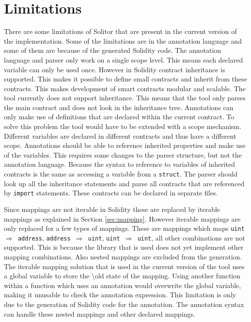 \documentclass[a4paper]{article}
\begin{document}
\section{Limitations}
\label{sec:limitations}
There are some limitations of Solitor that are present in the current version of the implementation. Some of the limitations are in the annotation language and some of them are because of the generated Solidity code. The annotation language and parser only work on a single scope level. This means each declared variable can only be used once. However in Solidity contract inheritance is supported. This makes it possible to define small contracts and inherit from these contracts. This makes development of smart contracts modular and scalable. The tool currently does not support inheritance. This means that the tool only parses the main contract and does not look in the inheritance tree. Annotations can only make use of definitions that are declared within the current contract. To solve this problem the tool would have to be extended with a scope mechanism. Different variables are declared in different contracts and thus have a different scope. Annotations should be able to reference inherited properties and make use of the variables. This requires some changes to the parser structure, but not the annotation language. Because the syntax to reference to variables of inherited contracts is the same as accessing a variable from a \texttt{struct}. The parser should look up all the inheritance statements and parse all contracts that are referenced by \texttt{import} statements. These contracts can be declared in separate files. \par
Since mappings are not iterable in Solidity these are replaced by iterable mappings as explained in Section \ref{sec:mapping}. However iterable mappings are only replaced for a few types of mappings. These are mappings which maps \texttt{uint $\Rightarrow$ address}, \texttt{address $\Rightarrow$ uint}, \texttt{uint $\Rightarrow$ uint}, all other combinations are not supported. This is because the library that is used does not yet implement other mapping combinations. Also nested mappings are excluded from the generation. The iterable mapping solution that is used in the current version of the tool uses a global variable to store the \textbackslash old state of the mapping. Using another function within a function which uses an annotation would overwrite the global variable, making it unusable to check the annotation expression. This limitation is only due to the generation of Solidity code for the annotation. The annotation syntax can handle these nested mappings and other declared mappings. \par
\end{document}
